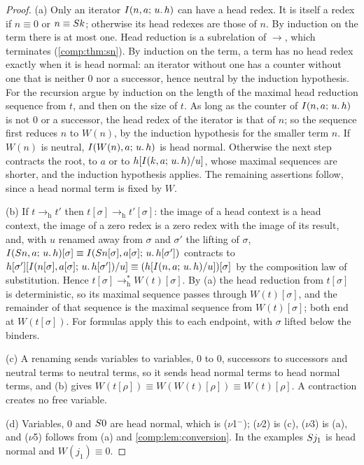 \begin{proof}
(a) Only an iterator $I(n,a;\,u.\,h)$ can have a head redex. It is itself a
redex if $n\equiv0$ or $n\equiv S k$; otherwise its head redexes are those
of $n$. By induction on the term there is at most one. Head reduction is a
subrelation of $\to$, which terminates (\cref{comp:thm:sn}). By induction on
the term, a term has no head redex exactly when it is head normal: an
iterator without one has a counter without one that is neither $0$ nor a
successor, hence neutral by the induction hypothesis. For the recursion argue
by induction on the length of the maximal head reduction sequence from $t$,
and then on the size of $t$. As long as the counter of $I(n,a;\,u.\,h)$ is
not $0$ or a successor, the head redex of the iterator is that of $n$; so the
sequence first reduces $n$ to $W(n)$, by the induction hypothesis for the
smaller term $n$. If $W(n)$ is neutral, $I(W(n),a;\,u.\,h)$ is head normal.
Otherwise the next step contracts the root, to $a$ or to
$h[I(k,a;\,u.\,h)/u]$, whose maximal sequences are shorter, and the
induction hypothesis applies. The remaining assertions follow, since a head
normal term is fixed by $W$.

(b) If $t\to_{\mathrm h}t'$ then $t[\sigma]\to_{\mathrm h}t'[\sigma]$: the
image of a head context is a head context, the image of a zero redex is a
zero redex with the image of its result, and, with $u$ renamed away from
$\sigma$ and $\sigma'$ the lifting of $\sigma$,
$I(S n,a;\,u.\,h)[\sigma]\equiv I(S n[\sigma],a[\sigma];\,u.\,h[\sigma'])$
contracts to
$h[\sigma'][I(n[\sigma],a[\sigma];\,u.\,h[\sigma'])/u]\equiv
(h[I(n,a;\,u.\,h)/u])[\sigma]$ by the composition law of
substitution. Hence $t[\sigma]\to_{\mathrm h}^{*}W(t)[\sigma]$. By (a) the
head reduction from $t[\sigma]$ is deterministic, so its maximal sequence
passes through $W(t)[\sigma]$, and the remainder of that sequence is the
maximal sequence from $W(t)[\sigma]$; both end at $W(t[\sigma])$. For
formulas apply this to each endpoint, with $\sigma$ lifted below the binders.

(c) A renaming sends variables to variables, $0$ to $0$, successors to
successors and neutral terms to neutral terms, so it sends head normal terms
to head normal terms, and (b) gives
$W(t[\rho])\equiv W(W(t)[\rho])\equiv W(t)[\rho]$. A contraction creates no
free variable.

(d) Variables, $0$ and $S0$ are head normal, which is ($\nu$1$^{-}$);
($\nu$2) is (c), ($\nu$3) is (a), and ($\nu$5) follows from (a) and
\cref{comp:lem:conversion}. In the examples $S j_1$ is head normal and
$W(j_1)\equiv0$.
\end{proof}

